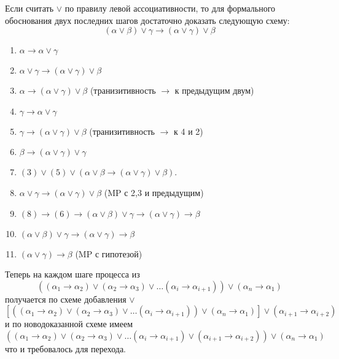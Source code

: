 \documentclass[10pt]{article}
\begin{document}
Если считать $\lor$ по правилу левой ассоциативности, то для формального обоснования двух последних шагов достаточно доказать следующую схему: 
\[ (\alpha \lor \beta) \lor \gamma \to (\alpha \lor \gamma) \lor \beta \]
\begin{enumerate}
    \item $\alpha \to \alpha \lor \gamma$ 
    \item $\alpha \lor \gamma \to (\alpha \lor \gamma) \lor \beta$
    \item $\alpha \to (\alpha \lor \gamma) \lor \beta$ (транизитивность $\to$ к предыдущим двум)
    \item $\gamma \to \alpha \lor \gamma$
    \item $\gamma \to (\alpha \lor \gamma) \lor \beta$ (транизитивность $\to$ к 4 и 2)
    \item $\beta \to (\alpha \lor \gamma) \lor \gamma$ 
    \item $(3) \lor (5) \lor (\alpha \lor \beta \to (\alpha \lor \gamma) \lor \beta)$.
    \item $\alpha \lor \gamma \to (\alpha \lor \gamma) \lor \beta$ (MP с 2,3 и предыдущим)
    \item $(8) \to (6) \to (\alpha \lor \beta) \lor \gamma \to (\alpha \lor \gamma) \to \beta$
    \item $(\alpha \lor \beta) \lor \gamma \to (\alpha \lor \gamma) \to \beta$
    \item $(\alpha \lor \gamma) \to \beta$ (MP с гипотезой)
\end{enumerate}
Теперь на каждом шаге процесса из 
\[ ((\alpha_1 \to \alpha_2) \lor (\alpha_2 \to \alpha_3) \lor \ldots (\alpha_i \to \alpha_{i+1})) \lor (\alpha_n \to \alpha_1)  \]
получается по схеме добавления $\lor$ 
\[ [((\alpha_1 \to \alpha_2) \lor (\alpha_2 \to \alpha_3) \lor \ldots (\alpha_i \to \alpha_{i+1})) \lor (\alpha_n \to \alpha_1)] \lor (\alpha_{i+1} \to \alpha_{i+2})\] 
и по новодоказанной схеме имеем 
\[ ((\alpha_1 \to \alpha_2) \lor (\alpha_2 \to \alpha_3) \lor \ldots (\alpha_i \to \alpha_{i+1}) \lor (\alpha_{i+1} \to \alpha_{i+2})) \lor (\alpha_n \to \alpha_1) \]
что и требовалось для перехода.



\end{document}
